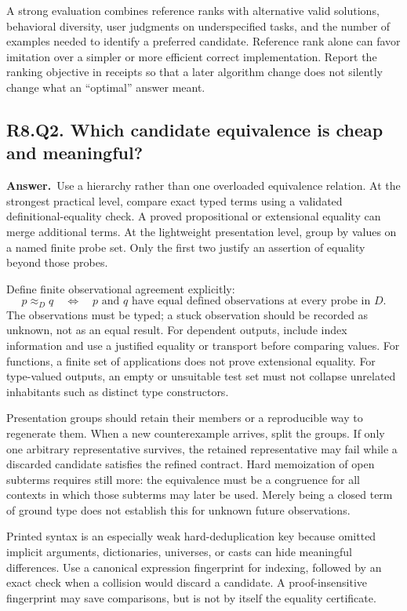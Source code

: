 \documentclass[11pt,a4paper]{article}
\theoremstyle{definition}
\theoremstyle{remark}
\newcommand{\answer}{\par\noindent\textbf{Answer.}\ }
\newcommand{\qheading}[2]{\subsection{#1. #2}}
\begin{document}
A strong evaluation combines reference ranks with alternative valid solutions,
behavioral diversity, user judgments on underspecified tasks, and the number
of examples needed to identify a preferred candidate. Reference rank alone
can favor imitation over a simpler or more efficient correct implementation.
Report the ranking objective in receipts so that a later algorithm change does
not silently change what an ``optimal'' answer meant.

\qheading{R8.Q2}{Which candidate equivalence is cheap and meaningful?}
\answer Use a hierarchy rather than one overloaded equivalence relation.
At the strongest practical level, compare exact typed terms using a validated
definitional-equality check. A proved propositional or extensional equality can
merge additional terms. At the lightweight presentation level, group by values
on a named finite probe set. Only the first two justify an assertion of equality
beyond those probes.

Define finite observational agreement explicitly:
\[
 p\approx_D q\quad\Longleftrightarrow\quad
 \text{$p$ and $q$ have equal defined observations at every probe in $D$}.
 \tag{19}
\]
The observations must be typed; a stuck observation should be recorded as
unknown, not as an equal result. For dependent outputs, include index information
and use a justified equality or transport before comparing values. For functions,
a finite set of applications does not prove extensional equality. For type-valued
outputs, an empty or unsuitable test set must not collapse unrelated inhabitants
such as distinct type constructors.

Presentation groups should retain their members or a reproducible way to
regenerate them. When a new counterexample arrives, split the groups. If only
one arbitrary representative survives, the retained representative may fail
while a discarded candidate satisfies the refined contract. Hard memoization
of open subterms requires still more: the equivalence must be a congruence for
all contexts in which those subterms may later be used. Merely being a closed
term of ground type does not establish this for unknown future observations.

Printed syntax is an especially weak hard-deduplication key because omitted
implicit arguments, dictionaries, universes, or casts can hide meaningful
differences. Use a canonical expression fingerprint for indexing, followed by
an exact check when a collision would discard a candidate. A proof-insensitive
fingerprint may save comparisons, but is not by itself the equality certificate.
\end{document}
